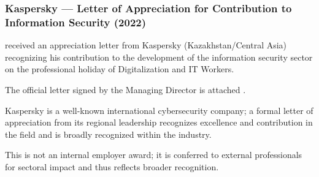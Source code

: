 \subsubsection{Kaspersky — Letter of Appreciation for Contribution to Information Security (2022)}
\label{subsubsec:AwardKaspersky2022}


\mrl received an appreciation letter from Kaspersky (Kazakhstan/Central Asia) recognizing his contribution to the development of the information security sector on the professional holiday of Digitalization and IT Workers.


The official letter signed by the Managing Director is attached .


Kaspersky is a well-known international cybersecurity company; a formal letter of appreciation from its regional leadership recognizes excellence and contribution in the field and is broadly recognized within the industry.


This is not an internal employer award; it is conferred to external professionals for sectoral impact and thus reflects broader recognition.

